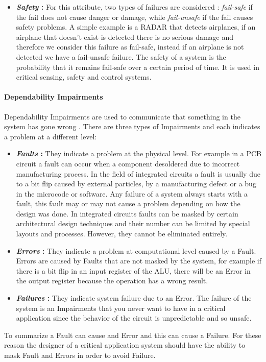{{{{\begin{itemize}
					\item \textbf{\textit{Safety} : } For this attribute, two types of failures are considered : \textit{fail-safe} if the fail does not cause danger or damage, while \textit{fail-unsafe} if the fail causes safety problems. A simple example is a RADAR that detects airplanes, if an airplane that doesn't exist is detected there is no serious damage and therefore we consider this failure as fail-safe, instead if an airplane is not detected we have a fail-unsafe failure. The safety of a system is the probability that it remains fail-safe over a certain period of time. It is used in critical sensing, safety and control systems. 
				\end{itemize}	
				
			} %
			\paragraph{Dependability Impairments}{
				Dependability Impairments are used to communicate that something in the system has gone wrong \cite{Dubrova2013}. There are three types of Impairments and each indicates a problem at a different level:
				\begin{itemize}
					\item \textbf{\textit{Faults} : } They indicate a problem at the physical level. For example in a PCB circuit a fault can occur when a component desoldered due to incorrect manufacturing process. In the field of integrated circuits a fault is usually due to a bit flip caused by external particles, by a manufacturing defect or a bug in the microcode or software. Any failure of a system always starts with a fault, this fault may or may not cause a problem depending on how the design was done. In integrated circuits faults can be masked by certain architectural design techniques and their number can be limited by special layouts and processes. However, they cannot be eliminated entirely.

					\item \textbf{\textit{Errors} : } They indicate a problem at computational level caused by a Fault. Errors are caused by Faults that are not masked by the system, for example if there is a  bit flip in an input register of the ALU, there will be an Error in the output register because the operation has a wrong result.
					
					\item \textbf{\textit{Failures} : }  They indicate system failure due to an Error. The failure of the system is an Impairments that you never want to have in a critical application since the behavior of the circuit is unpredictable and so unsafe. 
				\end{itemize}	
				To summarize a Fault can cause and Error and this can cause a Failure. For these reason the designer of a critical application system should have the ability to mask Fault and Errors in order to avoid Failure.
			} %
}}}
